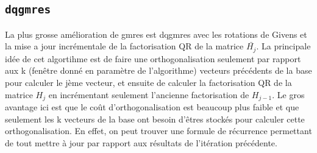  \subsection{\texttt{dqgmres}} 

La plus grosse amélioration de gmres est dqgmres avec les rotations de Givens et la mise a jour incrémentale de la factorisation QR de la matrice \(\bar{H_j}\). La principale idée de cet algortihme est de faire une orthogonalisation seulement par rapport aux k (fenêtre donné en paramètre de l'algorithme) vecteurs précédents de la base pour calculer le jème vecteur, et ensuite de calculer la factorisation QR de la matrice \(H_{j}\) en incrémentant seulement l'ancienne factorisation de \(H_{j-1}\). Le gros avantage ici est que le coût d'orthogonalisation est beaucoup plus faible et que seulement les k vecteurs de la base ont besoin d'êtres stockés  pour calculer cette orthogonalisation. En effet, on peut trouver une formule de récurrence permettant de tout mettre à jour par rapport aux résultats de l'itération précédente. \\


